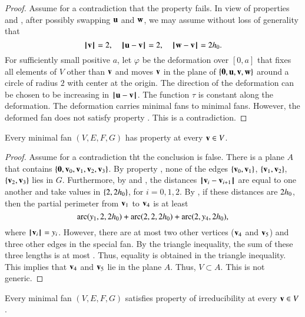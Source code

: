 \begin{proof}  Assume for a contradiction that the property fails.  In view of properties  and , after possibly swapping ${\mathbf u}$ and ${\mathbf w}$, we may assume without loss of generality that
$$
{{\hskip0.1em|\hskip-0.15em|\hskip0.1em}{\mathbf v}{\hskip0.1em|\hskip-0.15em|\hskip0.1em}}=2,\quad {\hskip0.1em|\hskip-0.15em|\hskip0.1em}{\mathbf u} - {\mathbf v}{\hskip0.1em|\hskip-0.15em|\hskip0.1em}=2,\quad {\hskip0.1em|\hskip-0.15em|\hskip0.1em}{\mathbf w} - {\mathbf v}{\hskip0.1em|\hskip-0.15em|\hskip0.1em}=2{h_0}.
$$
For sufficiently small positive $a$, let $\varphi$ be the deformation over $[0,a]$
that fixes all elements of $V$ other than ${\mathbf v}$ and moves ${\mathbf v}$ in the plane of
$\{{\mathbf 0},{\mathbf u},{\mathbf v},{\mathbf w}\}$ around a circle of radius $2$ with center at the origin.  The direction of the deformation can be chosen to be increasing in ${\hskip0.1em|\hskip-0.15em|\hskip0.1em}{\mathbf u} - {\mathbf v}{\hskip0.1em|\hskip-0.15em|\hskip0.1em}$.  The function $\tau$ is constant along the deformation.  The deformation carries minimal fans to minimal fans.  However, the deformed fan does not satisfy property .  This is a contradiction.
\end{proof}




\begin{lemma}  Every minimal fan $(V,E,F,G)$ has property  at every ${\mathbf v}\in V$.
\end{lemma}

\begin{proof} %
Assume for a contradiction tht the conclusion is false.  There is a plane $A$ that contains $\{{\mathbf 0},{\mathbf v}_0,{\mathbf v}_1,{\mathbf v}_2,{\mathbf v}_3\}$.
By property , none of the edges $\{{\mathbf v}_0,{\mathbf v}_1\}$, $\{{\mathbf v}_1,{\mathbf v}_2\}$, $\{{\mathbf v}_2,{\mathbf v}_3\}$ lies in $G$.  Furthermore, by  and , the distances ${\hskip0.1em|\hskip-0.15em|\hskip0.1em}{\mathbf v}_i - {\mathbf v}_{i+1}{\hskip0.1em|\hskip-0.15em|\hskip0.1em}$ are equal to one another and take values in $\{2,2{h_0}\}$, for $i=0,1,2$.  
By , if these distances are $2{h_0}$, then the partial perimeter from ${\mathbf v}_1$ to ${\mathbf v}_4$ is at least
\begin{equation}\label{eqn:3side}
\operatorname{arc}(y_1,2,2{h_0})+\operatorname{arc}(2,2,2{h_0})+\operatorname{arc}(2,y_4,2{h_0}),
\end{equation}
where ${{\hskip0.1em|\hskip-0.15em|\hskip0.1em}{\mathbf v}_i{\hskip0.1em|\hskip-0.15em|\hskip0.1em}}=y_i$.
However, there are at most two other vertices (${\mathbf v}_4$ and ${\mathbf v}_5$) and three other edges in the special fan.  By the triangle inequality, the sum of these three lengths is at most .
Thus, equality is obtained in the triangle inequality.  This implies that ${\mathbf v}_4$ and ${\mathbf v}_5$ lie in the plane $A$.  Thus, $V\subset A$.   This is not generic.
\end{proof}

\begin{lemma} 
Every minimal fan $(V,E,F,G)$ satisfies property  of irreducibility at every ${\mathbf v}\in V$.
\end{lemma}

